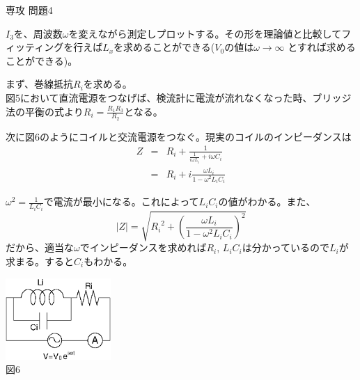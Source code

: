 \documentclass[fleqn]{jbook}
\begin{document}
\begin{answer}{専攻 問題4}{}
\begin{subanswers}
\begin{subsubanswers}
$I_3$を、周波数$\omega$を変えながら測定しプロットする。その形を理論値と比較してフィッティングを行えば$L_x$を求めることができる($V_0$の値は$\omega \rightarrow \infty$ とすれば求めることができる)。

\SubSubAnswer
まず、巻線抵抗$R_i$を求める。\\
図5において直流電源をつなげば、検流計に電流が流れなくなった時、ブリッジ法の平衡の式より$R_i = \frac{R_1 R_3}{R_2}$となる。

\begin{minipage}{.5\linewidth}
次に図6のようにコイルと交流電源をつなぐ。現実のコイルのインピーダンスは
\begin{eqnarray*}
 Z &=& R_i + \frac{1}{\frac{1}{i \omega L_i} + i \omega C_i} \\
   &=& R_i + i \frac{\omega L_i}{1 - {\omega}^2 L_i C_i}
\end{eqnarray*}

${\omega}^2 = \frac{1}{L_iC_i}$で電流が最小になる。これによって$L_iC_i$の値がわかる。また、
\[
|Z| = \sqrt{{R_i}^2 +\left(\frac{\omega L_i}{1-{\omega}^2 L_i C_i}\right)^2 }
\]
だから、適当な$\omega$でインピーダンスを求めれば$R_i$, $L_i C_i$は分かっているので$L_i$が求まる。すると$C_i$もわかる。
\end{minipage}
\hspace{.1\linewidth}
\begin{minipage}{.2\linewidth}
\begin{center}
\includegraphics[clip,width=4cm]{1999phy4-6.eps}\\
図6
\end{center}
\end{minipage}

\end{subsubanswers}


\end{subanswers}
\end{answer}
\end{document}
